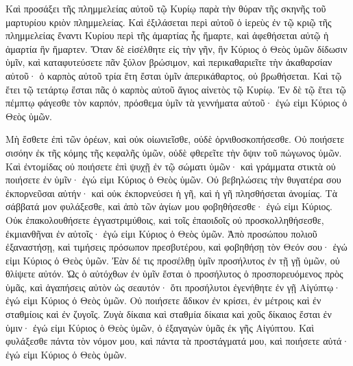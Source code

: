 {Καὶ προσάξει τῆς πλημμελείας αὐτοῦ τῷ Κυρίῳ παρὰ τὴν θύραν τῆς σκηνῆς τοῦ μαρτυρίου κριὸν πλημμελείας.
Καὶ ἐξιλάσεται περὶ αὐτοῦ ὁ ἱερεὺς ἐν τῷ κριῷ τῆς πλημμελείας ἔναντι Κυρίου περὶ τῆς ἁμαρτίας ἧς ἥμαρτε, καὶ ἀφεθήσεται αὐτῷ ἡ ἁμαρτία ἣν ἥμαρτεν.
Ὅταν δὲ εἰσέλθητε εἰς τὴν γῆν, ἣν Κύριος ὁ Θεὸς ὑμῶν δίδωσιν ὑμῖν, καὶ καταφυτεύσετε πᾶν ξύλον βρώσιμον, καὶ περικαθαριεῖτε τὴν ἀκαθαρσίαν αὐτοῦ· ὁ καρπὸς αὐτοῦ τρία ἔτη ἔσται ὑμῖν ἀπερικάθαρτος, οὐ βρωθήσεται.
Καὶ τῷ ἔτει τῷ τετάρτῳ ἔσται πᾶς ὁ καρπὸς αὐτοῦ ἅγιος αἰνετὸς τῷ Κυρίῳ.
Ἐν δὲ τῷ ἔτει τῷ πέμπτῳ φάγεσθε τὸν καρπόν, πρόσθεμα ὑμῖν τὰ γεννήματα αὐτοῦ· ἐγώ εἰμι Κύριος ὁ Θεὸς ὑμῶν.
\par }{\PP {}Μὴ ἔσθετε ἐπὶ τῶν ὀρέων, καὶ οὐκ οἰωνιεῖσθε, οὐδὲ ὀρνιθοσκοπήσεσθε.
Οὐ ποιήσετε σισόην ἐκ τῆς κόμης τῆς κεφαλῆς ὑμῶν, οὐδὲ φθερεῖτε τὴν ὄψιν τοῦ πώγωνος ὑμῶν.
Καὶ ἐντομίδας οὐ ποιήσετε ἐπὶ ψυχῇ ἐν τῷ σώματι ὑμῶν· καὶ γράμματα στικτὰ οὐ ποιήσετε ἐν ὑμῖν· ἐγώ εἰμι Κύριος ὁ Θεὸς ὑμῶν.
Οὐ βεβηλώσεις τὴν θυγατέρα σου ἐκπορνεῦσαι αὐτήν· καὶ οὐκ ἐκπορνεύσει ἡ γῆ, καὶ ἡ γῆ πλησθήσεται ἀνομίας.
Τὰ σάββατά μον φυλάξεσθε, καὶ ἀπὸ τῶν ἁγίων μου φοβηθήσεσθε· ἐγώ εἰμι Κύριος.
Οὐκ ἐπακολουθήσετε ἐγγαστριμύθοις, καὶ τοῖς ἐπαοιδοῖς οὐ προσκολληθήσεσθε, ἐκμιανθῆναι ἐν αὐτοῖς· ἐγώ εἰμι Κύριος ὁ Θεὸς ὑμῶν.
Ἀπὸ προσώπου πολιοῦ ἐξαναστήσῃ, καὶ τιμήσεις πρόσωπον πρεσβυτέρου, καὶ φοβηθήσῃ τὸν Θεόν σου· ἐγώ εἰμι Κύριος ὁ Θεὸς ὑμῶν.
Ἐὰν δέ τις προσέλθῃ ὑμῖν προσήλυτος ἐν τῇ γῇ ὑμῶν, οὐ θλίψετε αὐτόν.
Ὡς ὁ αὐτόχθων ἐν ὑμῖν ἔσται ὁ προσήλυτος ὁ προσπορευόμενος πρὸς ὑμᾶς, καὶ ἀγαπήσεις αὐτὸν ὡς σεαυτόν· ὅτι προσήλυτοι ἐγενήθητε ἐν γῇ Αἰγύπτῳ· ἐγώ εἰμι Κύριος ὁ Θεὸς ὑμῶν.
Οὐ ποιήσετε ἄδικον ἐν κρίσει, ἐν μέτροις καὶ ἐν σταθμίοις καὶ ἐν ζυγοῖς.
Ζυγὰ δίκαια καὶ σταθμία δίκαια καὶ χοῦς δίκαιος ἔσται ἐν ὑμιν· ἐγώ εἰμι Κύριος ὁ Θεὸς ὑμῶν, ὁ ἐξαγαγὼν ὑμᾶς ἐκ γῆς Αἰγύπτου.
Καὶ φυλάξεσθε πάντα τὸν νόμον μου, καὶ πάντα τὰ προστάγματά μου, καὶ ποιήσετε αὐτά· ἐγώ εἰμι Κύριος ὁ Θεὸς ὑμῶν.

}
